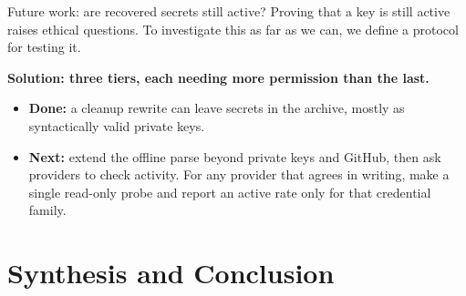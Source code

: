 \documentclass[aspectratio=169]{beamer}
\begin{document}
\begin{frame}{Future work: are recovered secrets still active?}
    \begingroup\footnotesize
    Proving that a key is still active raises ethical questions.
    To investigate this as far as we can, we define a protocol for testing it.
    \endgroup
    \vspace{0.5em}
    \begin{center}
    \begingroup\footnotesize\textbf{Solution: three tiers, each needing more permission
    than the last.}\endgroup\\[0.4em]
    \end{center}
    \vspace{0.4em}
    \begingroup\footnotesize
    \begin{itemize}\setlength{\itemsep}{0.25em}
        \item \textbf{Done:} a cleanup rewrite can leave secrets in the archive, mostly as syntactically valid private keys.
        \item \textbf{Next:} extend the offline parse beyond private keys and GitHub, then ask providers to check activity. For any provider that agrees in writing, make a single read-only probe and report an active rate only for that credential family.
    \end{itemize}
    \endgroup
\end{frame}


\section{Synthesis and Conclusion}
\end{document}

